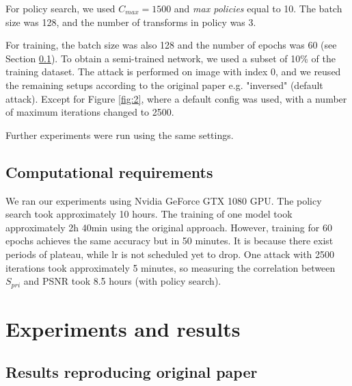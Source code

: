 For policy search, we used $C_{max} = 1500$ and \emph{max policies} equal to 10. The batch size was 128, and the number of transforms in policy was 3.

For training, the batch size was also 128 and the number of epochs was 60 (see Section \ref{section:computational-requirements}). To obtain a semi-trained network, we used a subset of 10\% of the training dataset. The attack is performed on image with index $0$, and we reused the remaining setups according to the original paper e.g. "inversed" (default attack). Except for Figure \ref{fig:2}, where a default config was used, with a number of maximum iterations changed to 2500.

Further experiments were run using the same settings.

\subsection{Computational requirements}
\label{section:computational-requirements}
We ran our experiments using Nvidia GeForce GTX 1080 GPU. The policy search took approximately 10 hours. The training of one model took approximately 2h 40min using the original approach. However, training for 60 epochs achieves the same accuracy but in 50 minutes. It is because there exist periods of plateau, while lr is not scheduled yet to drop. One attack with 2500 iterations took approximately 5 minutes, so measuring the correlation between $S_{pri}$ and PSNR took 8.5 hours (with policy search).



\section{Experiments and results}
\label{sec:results}

\subsection{Results reproducing original paper}

